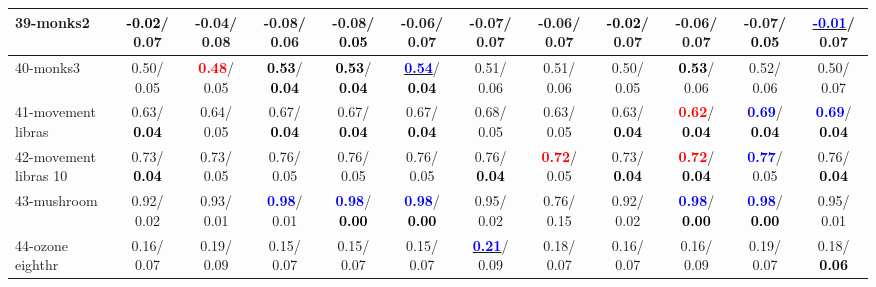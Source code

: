 \begin{table}[h]
\begin{center}
{\begin{tabular}{lc|c|c|c|c|c|c|c|c|c|c}
39-monks2 & \textcolor{black}{\textbf{ -0.02}}/  0.07 &  -0.04/  0.08 &  -0.08/  0.06 &  -0.08/\textcolor{black}{\textbf{  0.05}} &  -0.06/  0.07 &  -0.07/  0.07 &  -0.06/  0.07 & \textcolor{black}{\textbf{ -0.02}}/  0.07 &  -0.06/  0.07 &  -0.07/\textcolor{black}{\textbf{  0.05}} & \underline{\textcolor{blue}{\textbf{ -0.01}}}/  0.07 \\ \hline
40-monks3 &   0.50/  0.05 & \textcolor{red}{\textbf{  0.48}}/  0.05 & \textcolor{black}{\textbf{  0.53}}/\textcolor{black}{\textbf{  0.04}} & \textcolor{black}{\textbf{  0.53}}/\textcolor{black}{\textbf{  0.04}} & \underline{\textcolor{blue}{\textbf{  0.54}}}/\textcolor{black}{\textbf{  0.04}} &   0.51/  0.06 &   0.51/  0.06 &   0.50/  0.05 & \textcolor{black}{\textbf{  0.53}}/  0.06 &   0.52/  0.06 &   0.50/  0.07 \\
41-movement libras &   0.63/\textcolor{black}{\textbf{  0.04}} &   0.64/  0.05 &   0.67/\textcolor{black}{\textbf{  0.04}} &   0.67/\textcolor{black}{\textbf{  0.04}} &   0.67/\textcolor{black}{\textbf{  0.04}} &   0.68/  0.05 &   0.63/  0.05 &   0.63/\textcolor{black}{\textbf{  0.04}} & \textcolor{red}{\textbf{  0.62}}/\textcolor{black}{\textbf{  0.04}} & \textcolor{blue}{\textbf{  0.69}}/\textcolor{black}{\textbf{  0.04}} & \textcolor{blue}{\textbf{  0.69}}/\textcolor{black}{\textbf{  0.04}} \\
42-movement libras 10 &   0.73/\textcolor{black}{\textbf{  0.04}} &   0.73/  0.05 &   0.76/  0.05 &   0.76/  0.05 &   0.76/  0.05 &   0.76/\textcolor{black}{\textbf{  0.04}} & \textcolor{red}{\textbf{  0.72}}/  0.05 &   0.73/\textcolor{black}{\textbf{  0.04}} & \textcolor{red}{\textbf{  0.72}}/\textcolor{black}{\textbf{  0.04}} & \textcolor{blue}{\textbf{  0.77}}/  0.05 &   0.76/\textcolor{black}{\textbf{  0.04}} \\
43-mushroom &   0.92/  0.02 &   0.93/  0.01 & \textcolor{blue}{\textbf{  0.98}}/  0.01 & \textcolor{blue}{\textbf{  0.98}}/\textcolor{black}{\textbf{  0.00}} & \textcolor{blue}{\textbf{  0.98}}/\textcolor{black}{\textbf{  0.00}} &   0.95/  0.02 &   0.76/  0.15 &   0.92/  0.02 & \textcolor{blue}{\textbf{  0.98}}/\textcolor{black}{\textbf{  0.00}} & \textcolor{blue}{\textbf{  0.98}}/\textcolor{black}{\textbf{  0.00}} &   0.95/  0.01 \\
44-ozone eighthr &   0.16/  0.07 &   0.19/  0.09 &   0.15/  0.07 &   0.15/  0.07 &   0.15/  0.07 & \underline{\textcolor{blue}{\textbf{  0.21}}}/  0.09 &   0.18/  0.07 &   0.16/  0.07 &   0.16/  0.09 &   0.19/  0.07 &   0.18/\textcolor{black}{\textbf{  0.06}} \\

\end{tabular}}
\end{center}
\end{table}
